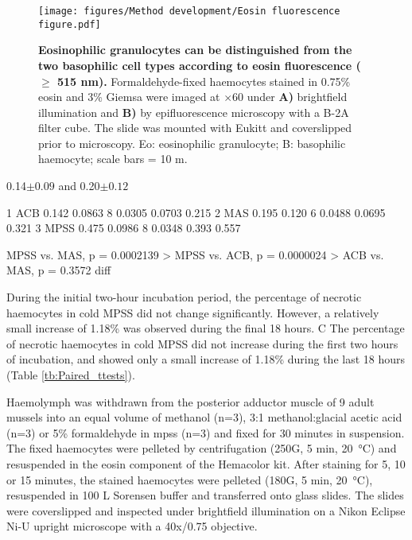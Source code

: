 \begin{figure}[!ht]
    \centering
    \texttt{[image: figures/Method development/Eosin fluorescence figure.pdf]}
    \caption{\textbf{Eosinophilic granulocytes can be distinguished from the two basophilic cell types according to eosin fluorescence ($\geq$ 515 nm).} Formaldehyde-fixed haemocytes stained in 0.75\% eosin and 3\% Giemsa were imaged at $\times$60 under \textbf{A)} brightfield illumination and \textbf{B)} by epifluorescence microscopy with a B-2A filter cube. The slide was mounted with Eukitt\textsuperscript{\textregistered} and coverslipped prior to microscopy. Eo: eosinophilic granulocyte; B: basophilic haemocyte; scale bars = 10 \micro m. }
    \label{fig:reserve}
\end{figure}

0.14$\pm{0.09}$ and  0.20$\pm{0.12}$


1 ACB    0.142  0.0863   8   0.0305   0.0703    0.215
2 MAS    0.195  0.120    6   0.0488   0.0695    0.321
3 MPSS   0.475  0.0986   8   0.0348   0.393     0.557

MPSS vs. MAS, p = 0.0002139 >
MPSS vs. ACB, p = 0.0000024 >
ACB vs.  MAS, p = 0.3572    diff

During the initial two-hour incubation period, the percentage of necrotic haemocytes in cold MPSS did not change significantly. However, a relatively small increase of 1.18\% was observed during the final 18 hours. C
The percentage of necrotic haemocytes in cold MPSS did not increase during the first two hours of incubation, and showed only a small increase of 1.18\% during the last 18 hours (Table \ref{tb:Paired_ttests}).


Haemolymph was withdrawn from the posterior adductor muscle of 9 adult mussels into an equal volume of methanol (n=3), 3:1 methanol:glacial acetic acid (n=3) or 5\% formaldehyde in \acrshort{mpss} (n=3) and fixed for 30 minutes in suspension. The fixed haemocytes were pelleted by centrifugation (250G, 5 min, \SI{20}{\celsius}) and resuspended in the eosin component of the Hemacolor\textsuperscript{\textregistered} kit. After staining for 5, 10 or 15 minutes, the stained haemocytes were pelleted (180G, 5 min, \SI{20}{\celsius}), resuspended in 100 \micro L Sorensen buffer and transferred onto glass slides. The slides were coverslipped and inspected under brightfield illumination on a Nikon Eclipse Ni-U upright microscope with a 40x/0.75 objective.